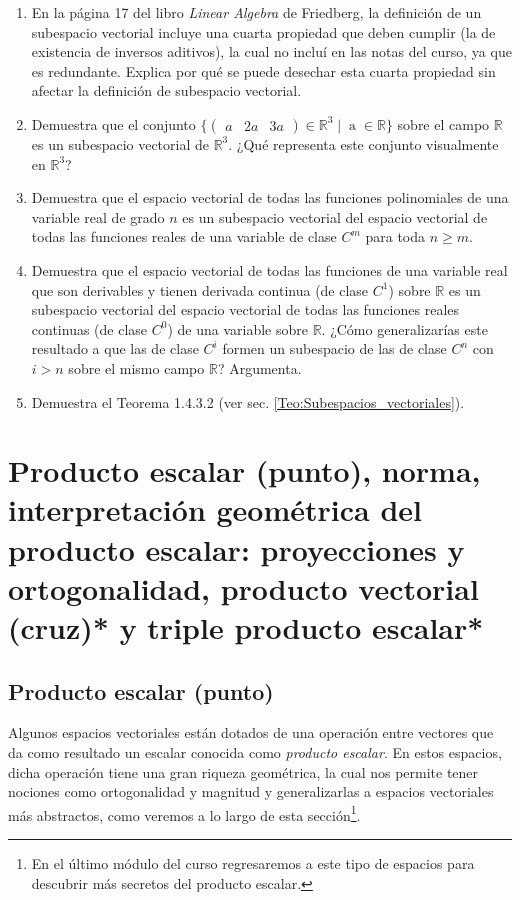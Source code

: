 \documentclass[12pt,dvipsnames]{article}
\begin{document}
\begin{enumerate}
    \item En la página 17 del libro \textit{Linear Algebra} de Friedberg, la definición de un subespacio vectorial incluye una cuarta propiedad que deben cumplir (la de existencia de inversos aditivos), la cual no incluí en las notas del curso, ya que es redundante. Explica por qué se puede desechar esta cuarta propiedad sin afectar la definición de subespacio vectorial. 
    \item Demuestra que el conjunto $\{\begin{pmatrix} a&2a&3a \end{pmatrix}\in\mathbb{R}^3\mathop|\mathop a\in\mathbb{R}\}$ sobre el campo $\mathbb{R}$ es un subespacio vectorial de $\mathbb{R}^3$. ¿Qué representa este conjunto visualmente en $\mathbb{R}^3$? 
    \item Demuestra que el espacio vectorial de todas las funciones polinomiales de una variable real de grado $n$ es un subespacio vectorial del espacio vectorial de todas las funciones reales de una variable de clase $C^m$ para toda $n \geq m$. 
    \item Demuestra que el espacio vectorial de todas las funciones de una variable real que son derivables y tienen derivada continua (de clase $C^1$) sobre $\mathbb{R}$ es un subespacio vectorial del espacio vectorial de todas las funciones reales continuas (de clase $C^0$) de una variable sobre $\mathbb{R}$. ¿Cómo generalizarías este resultado a que las de clase $C^i$ formen un subespacio de las de clase $C^n$ con $i>n$ sobre el mismo campo $\mathbb{R}$? Argumenta. 
    \item Demuestra el Teorema 1.4.3.2 (ver sec. \ref{Teo:Subespacios_vectoriales}). 
\end{enumerate}


\newpage
\section{Producto escalar (punto), norma, interpretación geométrica del producto escalar: proyecciones y ortogonalidad, producto vectorial (cruz)* y triple producto escalar*} \label{Sec:2}

\subsection{Producto escalar (punto)} \label{Subsec:Producto_escalar}

Algunos espacios vectoriales están dotados de una operación entre vectores que da como resultado un escalar conocida como \emph{producto escalar}. En estos espacios, dicha operación tiene una gran riqueza geométrica, la cual nos permite tener nociones como ortogonalidad y magnitud \textemdash y generalizarlas a espacios vectoriales más abstractos, como veremos a lo largo de esta sección\footnote{En el último módulo del curso regresaremos a este tipo de espacios para descubrir más secretos del producto escalar.}.
\end{document}
